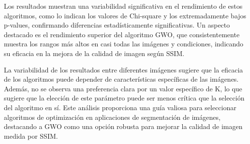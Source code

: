 \documentclass[conference]{IEEEtran}
\begin{document}
\noindent Los resultados muestran una variabilidad significativa en el rendimiento de estos algoritmos, como lo indican los valores de Chi-square y los extremadamente bajos p-values, confirmando diferencias estadísticamente significativas. Un aspecto destacado es el rendimiento superior del algoritmo GWO, que consistentemente muestra los rangos más altos en casi todas las imágenes y condiciones, indicando su eficacia en la mejora de la calidad de imagen según SSIM. 

\noindent La variabilidad de los resultados entre diferentes imágenes sugiere que la eficacia de los algoritmos puede depender de características específicas de las imágenes. Además, no se observa una preferencia clara por un valor específico de K, lo que sugiere que la elección de este parámetro puede ser menos crítica que la selección del algoritmo en sí. Este análisis proporciona una guía valiosa para seleccionar algoritmos de optimización en aplicaciones de segmentación de imágenes, destacando a GWO como una opción robusta para mejorar la calidad de imagen medida por SSIM.
\end{document}
